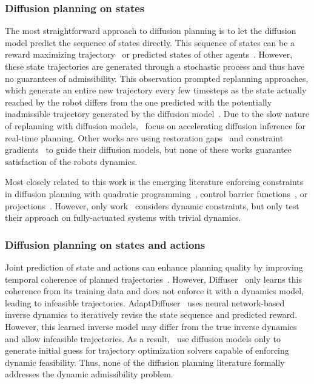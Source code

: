 \subsubsection{Diffusion planning on states}

The most straightforward approach to diffusion planning is to let the diffusion model predict the sequence of states directly. This sequence of states can be a reward maximizing trajectory~\citep{DecisionDiffuser} or predicted states of other agents~\citep{gu2022stochastic}. However, these state trajectories are generated through a stochastic process and thus have no guarantees of admissibility. This observation prompted replanning approaches, which generate an entire new trajectory every few timesteps as the state actually reached by the robot differs from the one predicted with the potentially inadmissible trajectory generated by the diffusion model~\citep{Replanning}. Due to the slow nature of replanning with diffusion models,~\citep{DiffuserLite, DiffuseLoco} focus on accelerating diffusion inference for real-time planning. Other works are using restoration gaps~\citep{lee2024refining} and constraint gradients~\citep{saha2024edmp} to guide their diffusion models, but none of these works guarantee satisfaction of the robots dynamics.

Most closely related to this work is the emerging literature enforcing constraints in diffusion planning with quadratic programming~\citep{CGD}, control barrier functions~\citep{SafeDiffuser}, or projections~\citep{romer2024safe}. However, only work~\citep{romer2024diffusion} considers dynamic constraints, but only test their approach on fully-actuated systems with trivial dynamics.


\subsubsection{Diffusion planning on states and actions}

Joint prediction of state and actions can enhance planning quality by improving temporal coherence of planned trajectories~\citep{Diffuser}. However, Diffuser~\citep{Diffuser} only learns this coherence from its training data and does not enforce it with a dynamics model, leading to infeasible trajectories. AdaptDiffuser~\citep{AdaptDiffuser} uses neural network-based inverse dynamics to iteratively revise the state sequence and predicted reward. However, this learned inverse model may differ from the true inverse dynamics and allow infeasible trajectories. As a result,~\citep{RyneBeeson, power2023sampling} use diffusion models only to generate initial guess for trajectory optimization solvers capable of enforcing dynamic feasibility. Thus, none of the diffusion planning literature formally addresses the dynamic admissibility problem.







